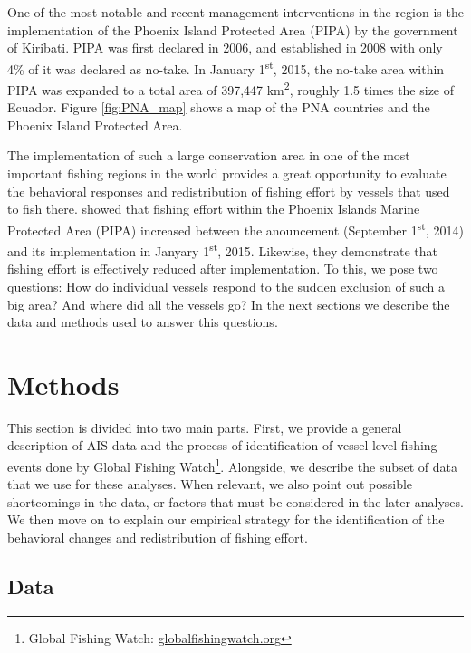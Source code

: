\documentclass[11pt,]{article}
\let\rmarkdownfootnote\footnote%
\def\footnote{\protect\rmarkdownfootnote}
\begin{document}
One of the most notable and recent management interventions in the
region is the implementation of the Phoenix Island Protected Area (PIPA)
by the government of Kiribati. PIPA was first declared in 2006, and
established in 2008 with only 4\% of it was declared as no-take. In
January 1\textsuperscript{st}, 2015, the no-take area within PIPA was
expanded to a total area of 397,447 km\textsuperscript{2}, roughly 1.5
times the size of Ecuador. Figure \ref{fig:PNA_map} shows a map of the
PNA countries and the Phoenix Island Protected Area.

The implementation of such a large conservation area in one of the most
important fishing regions in the world provides a great opportunity to
evaluate the behavioral responses and redistribution of fishing effort
by vessels that used to fish there. \citet{mcdermott_2018} showed that
fishing effort within the Phoenix Islands Marine Protected Area (PIPA)
increased between the anouncement (September 1\textsuperscript{st},
2014) and its implementation in Janyary 1\textsuperscript{st}, 2015.
Likewise, they demonstrate that fishing effort is effectively reduced
after implementation. To this, we pose two questions: How do individual
vessels respond to the sudden exclusion of such a big area? And where
did all the vessels go? In the next sections we describe the data and
methods used to answer this questions.

\hypertarget{methods}{%
\section{Methods}\label{methods}}

This section is divided into two main parts. First, we provide a general
description of AIS data and the process of identification of
vessel-level fishing events done by Global Fishing Watch\footnote{Global
  Fishing Watch: \url{globalfishingwatch.org}}. Alongside, we describe
the subset of data that we use for these analyses. When relevant, we
also point out possible shortcomings in the data, or factors that must
be considered in the later analyses. We then move on to explain our
empirical strategy for the identification of the behavioral changes and
redistribution of fishing effort.

\hypertarget{data}{%
\subsection{Data}\label{data}}
\end{document}
